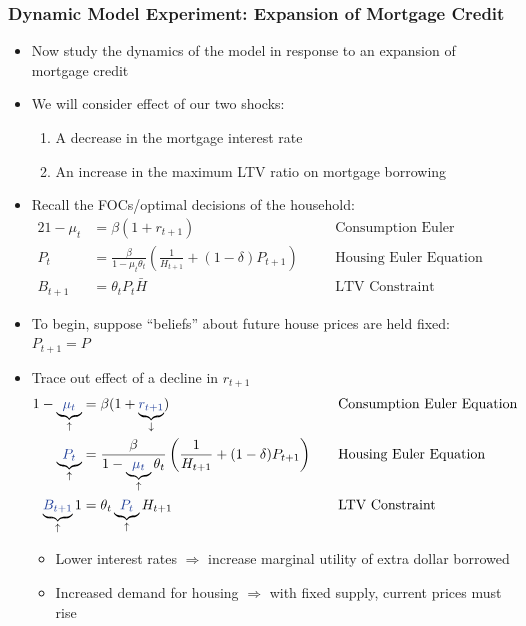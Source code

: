 \documentclass[a4paper,twoside]{article}
\numberwithin{equation}{section}
\numberwithin{figure}{section}
\begin{document}
\subsubsection{Dynamic Model Experiment: Expansion of Mortgage Credit}
	\begin{itemize}
		\item Now study the \textcolor{myblue}{dynamics} of the model in response to an expansion of mortgage credit
		\item We will consider effect of our two shocks:
		\begin{enumerate}[label=\textbf{\arabic*.}]
			\item A decrease in the mortgage interest rate
			\item An increase in the maximum LTV ratio on mortgage borrowing
		\end{enumerate}
		\item Recall the FOCs/optimal decisions of the household:
		\begin{alignat*}{2}
			1-\mu_t&=\beta(1+r_{t+1}) &&\text{Consumption Euler Equation}\\
			P_t&=\frac{\beta}{1-\mu_t\theta_t}\left( \frac{1}{H_{t+1}} + (1-\delta)P_{t+1} \right)\quad &&\text{Housing Euler Equation}\\
			B_{t+1}&=\theta_tP_t\bar{H} &&\text{LTV Constraint}
		\end{alignat*}
		\item To begin, suppose ``beliefs'' about future house prices are held fixed: \( P_{t+1} = P \)
		\item Trace out effect of a decline in \textcolor{myblue}{\( r_{t+1} \)}
		\begin{alignat*}{2}
			1-\underbrace{\textcolor{myblue}{\mu_t}}_\uparrow&=\beta(1+\underbrace{\textcolor{myblue}{r_{t+1}}}_\downarrow) &&\text{Consumption Euler Equation}\\
			\underbrace{\textcolor{myblue}{P_t}}_\uparrow&=\frac{\beta}{1-\underbrace{\textcolor{myblue}{\mu_t}}_\uparrow\theta_t}\left( \frac{1}{H_{t+1}} + (1-\delta)P_{t+1} \right)\quad &&\text{Housing Euler Equation}\\
			\underbrace{\textcolor{myblue}{B_{t+1}}}_\uparrow1&=\theta_t\underbrace{\textcolor{myblue}{P_t}}_\uparrow H_{t+1} &&\text{LTV Constraint}
		\end{alignat*}
		\begin{itemize}
			\item Lower interest rates \( \Rightarrow \) increase marginal utility of extra dollar borrowed
			\item Increased demand for housing \( \Rightarrow \) with fixed supply, current prices must rise

\end{itemize}
\end{itemize}
\end{document}

